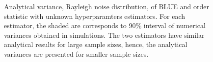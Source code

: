 \documentclass[journal]{IEEEtran}
\begin{document}
\begin{figure}[!t]
	\centering
	\hfil
	\caption{Analytical variance, Rayleigh noise distribution, of BLUE and order statistic with unknown hyperparamters estimators. For each estimator, the shaded are corresponds to $90\%$ interval of numerical variances obtained in simulations. The two estimators have similar analytical results for large sample sizes, hence, the analytical variances are presented for smaller sample sizes.}
	\label{fig:rayleigh_blue_order}
\end{figure}
%
%
\end{document}
